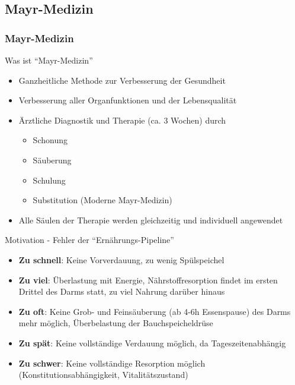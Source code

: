 \documentclass[xcolor=dvipsnames]{beamer}
\begin{document}
    \subsection{Mayr-Medizin}
    \begin{frame}[allowframebreaks]
        \frametitle{Mayr-Medizin}

        \begin{block}{Was ist "`Mayr-Medizin"'}
            \begin{itemize}
                \setlength\itemsep{1em}
                \item Ganzheitliche Methode zur Verbesserung der Gesundheit
                \item Verbesserung aller Organfunktionen und der Lebensqualität
                \item Ärztliche Diagnostik und Therapie (ca. 3 Wochen) durch
                \begin{itemize}
                    \item Schonung
                    \item Säuberung
                    \item Schulung
                    \item Substitution (Moderne Mayr-Medizin)
                \end{itemize}
                \item Alle Säulen der Therapie werden gleichzeitig und individuell angewendet
            \end{itemize}
        \end{block}

        \begin{block}{Motivation - Fehler der "`Ernährungs-Pipeline"'}
            \begin{itemize}
                \setlength\itemsep{1em}
                \item \textbf{Zu schnell}: Keine Vorverdauung, zu wenig Spülspeichel
                \item \textbf{Zu viel}: Überlastung mit Energie, Nährstoffresorption findet im ersten Drittel des Darms statt, zu viel Nahrung darüber hinaus
                \item \textbf{Zu oft}: Keine Grob- und Feinsäuberung (ab 4-6h Essenspause) des Darms mehr möglich, Überbelastung der Bauchspeicheldrüse
                \item \textbf{Zu spät}: Keine vollständige Verdauung möglich, da Tageszeitenabhängig
                \item \textbf{Zu schwer}: Keine vollständige Resorption möglich (Konstitutionsabhängigkeit, Vitalitätszustand)
            \end{itemize}
        \end{block}


\end{frame}
\end{document}
